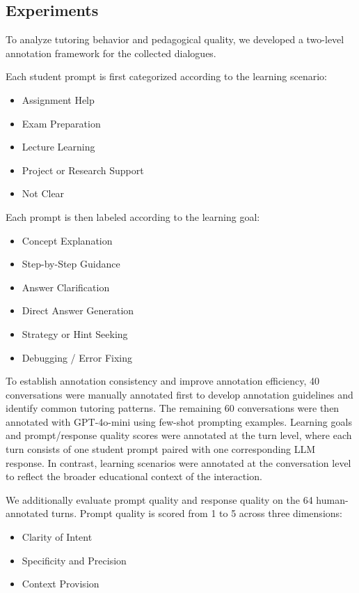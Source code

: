 \subsection{Experiments}

To analyze tutoring behavior and pedagogical quality, we developed a two-level annotation framework for the collected dialogues.

Each student prompt is first categorized according to the learning scenario:

\begin{itemize}
    \item Assignment Help
    \item Exam Preparation
    \item Lecture Learning
    \item Project or Research Support
    \item Not Clear
\end{itemize}

Each prompt is then labeled according to the learning goal:

\begin{itemize}
    \item Concept Explanation
    \item Step-by-Step Guidance
    \item Answer Clarification
    \item Direct Answer Generation
    \item Strategy or Hint Seeking
    \item Debugging / Error Fixing
\end{itemize}

To establish annotation consistency and improve annotation efficiency, 40 conversations were manually annotated first to develop annotation guidelines and identify common tutoring patterns. The remaining 60 conversations were then annotated with GPT-4o-mini using few-shot prompting examples. Learning goals and prompt/response quality scores were annotated at the turn level, where each turn consists of one student prompt paired with one corresponding LLM response. In contrast, learning scenarios were annotated at the conversation level to reflect the broader educational context of the interaction.

We additionally evaluate prompt quality and response quality on the 64 human-annotated turns. Prompt quality is scored from 1 to 5 across three dimensions:

\begin{itemize}
    \item Clarity of Intent
    \item Specificity and Precision
    \item Context Provision
\end{itemize}

